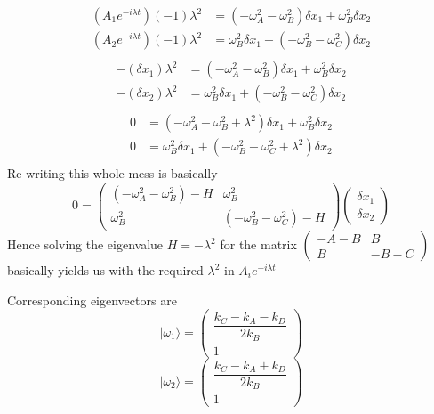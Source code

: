 \documentclass[letter]{article}
\begin{document}
\begin{tcolorbox}[sharpish corners, colframe=black]
 \begin{align*}
	 (A_1 e^{- i  \lambda t}) (-1)\lambda^2 	  &= (-\omega^2_A - \omega^2_B ) \delta x_1 + \omega_B^2 \delta x_2  \\
	 (A_2 e^{- i \lambda t}) (-1)\lambda^2 &= \omega^2_B \delta x_1 + (- \omega_B^2 - \omega_C^2 ) \delta x_2 \\
 \end{align*}
 \begin{align*}
	 -(\delta x_1) \lambda^2 	  &= (-\omega^2_A - \omega^2_B ) \delta x_1 + \omega_B^2 \delta x_2  \\
	 -(\delta x_2) \lambda^2 &= \omega^2_B \delta x_1 + (- \omega_B^2 - \omega_C^2 ) \delta x_2 \\
 \end{align*}
 \begin{align*}
	 0 	  &= (-\omega^2_A - \omega^2_B + \lambda^2)  \delta x_1 + \omega_B^2 \delta x_2  \\
	 0 &= \omega^2_B   \delta x_1 + (- \omega_B^2 - \omega_C^2 + \lambda^2) \delta x_2 \\
 \end{align*}
 Re-writing this whole mess is basically 
\[   0 = \begin{pmatrix}  (-\omega^2_A - \omega^2_B )-H & \omega_B^2 \\
	\omega^2_B  & (- \omega_B^2 - \omega_C^2 ) - H
\end{pmatrix} 
\begin{pmatrix} \delta x_1 \\ \delta x_2 \end{pmatrix} 
\]
Hence solving the eigenvalue $H = - \lambda^2 $ for the matrix 
$
	\begin{pmatrix} -A-B & B \\ B & -B-C \end{pmatrix} $ 
 basically yields us with the required $\lambda^2$ in $A_i e^{- i \lambda t}$ 
\end{tcolorbox}
Corresponding eigenvectors are 
\[
| \omega_1 \rangle = 
\begin{pmatrix}   \dfrac{ k_C - k_A - k_D}{2k_B} \\ 1 \end{pmatrix} 
\] 
\[
| \omega_2 \rangle = 
\begin{pmatrix}   \dfrac{k_C - k_A + k_D }{2k_B} \\ 1 \end{pmatrix} 
\]
\end{document}
